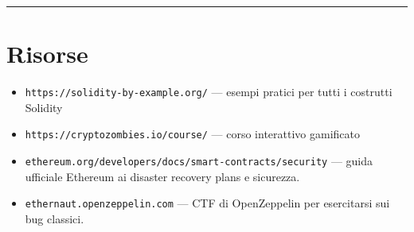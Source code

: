 \documentclass[
  italian,
  openany]{book}
\providecommand{\tightlist}{%
  \setlength{\itemsep}{0pt}\setlength{\parskip}{0pt}}
\begin{document}
\begin{center}\rule{0.5\linewidth}{0.5pt}\end{center}

\section{Risorse}\label{risorse}

\begin{itemize}
\tightlist
\item
  \texttt{https://solidity-by-example.org/} --- esempi pratici per tutti
  i costrutti Solidity
\item
  \texttt{https://cryptozombies.io/course/} --- corso interattivo
  gamificato
\item
  \texttt{ethereum.org/developers/docs/smart-contracts/security} ---
  guida ufficiale Ethereum ai disaster recovery plans e sicurezza.
\item
  \texttt{ethernaut.openzeppelin.com} --- CTF di OpenZeppelin per
  esercitarsi sui bug classici.
\end{itemize}

\newpage

\backmatter
\end{document}
